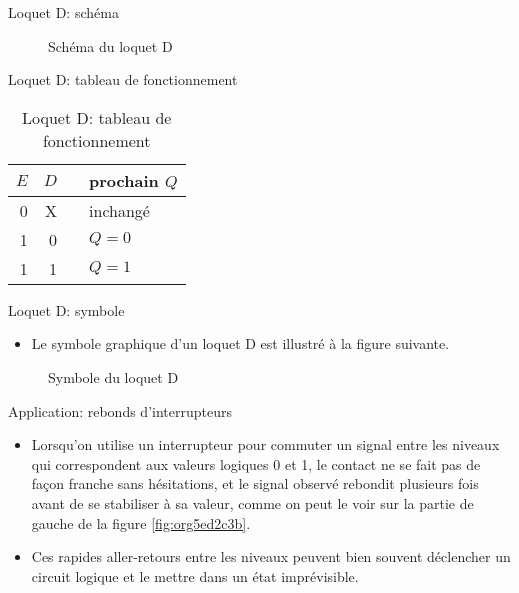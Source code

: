 \documentclass[presentation]{beamer}
\begin{document}
\begin{frame}[label={sec:org0af315e}]{Loquet D: schéma}
\begin{figure}[htbp]
\centering

\caption{\label{fig:orga6e4afc}Schéma du loquet D}
\end{figure}
\end{frame}

\begin{frame}[label={sec:org5afbbb3}]{Loquet D: tableau de fonctionnement}
\begin{table}[htbp]
\caption{\label{tab:org24c2479}Loquet D: tableau de fonctionnement}
\centering
\begin{tabular}{rrll}
\(E\) & \(D\) &  & prochain \(Q\)\\
\hline
0 & X &  & inchangé\\
1 & 0 &  & \(Q = 0\)\\
1 & 1 &  & \(Q = 1\)\\
\end{tabular}
\end{table}
\end{frame}

\begin{frame}[label={sec:org5026759}]{Loquet D: symbole}
\begin{itemize}
\item Le symbole graphique d'un loquet D est illustré à la figure suivante.
\end{itemize}

\begin{figure}[htbp]
\centering

\caption{\label{fig:org843a0fe}Symbole du loquet D}
\end{figure}
\end{frame}

\begin{frame}[label={sec:org743f455}]{Application: rebonds d'interrupteurs}
\begin{itemize}
\item Lorsqu'on utilise un interrupteur pour commuter un signal entre les niveaux qui correspondent aux valeurs logiques 0 et 1, le contact ne se fait pas de façon franche sans hésitations, et le signal observé rebondit plusieurs fois avant de se stabiliser à sa valeur, comme on peut le voir sur la partie de gauche de la figure \ref{fig:org5ed2c3b}.

\item Ces rapides aller-retours entre les niveaux peuvent bien souvent déclencher un circuit logique et le mettre dans un état imprévisible.
\end{itemize}
\end{frame}
\end{document}
